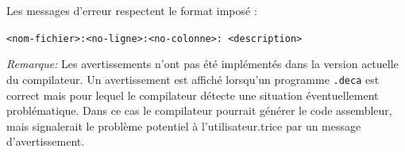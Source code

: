 \noindent
Les messages d'erreur respectent le format imposé :
\begin{center}
\texttt{<nom-fichier>:<no-ligne>:<no-colonne>: <description>}
\end{center}

\noindent
\textit{Remarque: } Les avertissements n'ont pas été implémentés dans la version actuelle du compilateur. Un avertissement est affiché lorsqu'un programme \texttt{.deca} est correct mais pour lequel le compilateur détecte une situation éventuellement problématique. Dans ce cas le compilateur pourrait générer le code assembleur, mais signalerait le problème potentiel à l'utilisateur.trice par un message d'avertissement.

